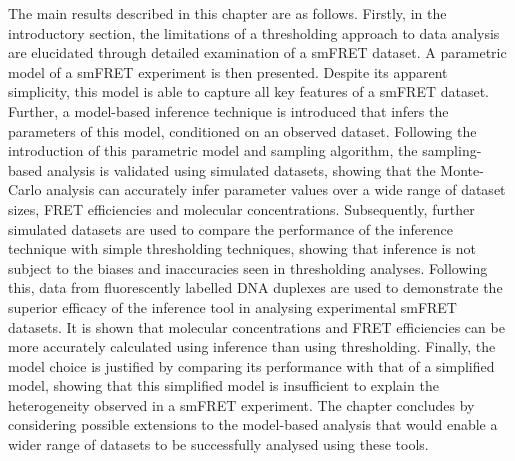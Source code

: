 The main results described in this chapter are as follows. Firstly, in the introductory section, the limitations of a thresholding approach to data analysis are elucidated through detailed examination of a smFRET dataset. A parametric model of a smFRET experiment is then presented. Despite its apparent simplicity, this model is able to capture all key features of a smFRET dataset. Further, a model-based inference technique is introduced that infers the parameters of this model, conditioned on an observed dataset. Following the introduction of this parametric model and sampling algorithm, the sampling-based analysis is validated using simulated datasets, showing that the Monte-Carlo analysis can accurately infer parameter values over a wide range of dataset sizes, FRET efficiencies and molecular concentrations. Subsequently, further simulated datasets are used to compare the performance of the inference technique with simple thresholding techniques, showing that inference is not subject to the biases and inaccuracies seen in thresholding analyses. Following this, data from fluorescently labelled DNA duplexes are used to demonstrate the superior efficacy of the inference tool in analysing experimental smFRET datasets. It is shown that molecular concentrations and FRET efficiencies can be more accurately calculated using inference than using thresholding. Finally, the model choice is justified by comparing its performance with that of a simplified model, showing that this simplified model is insufficient to explain the heterogeneity observed in a smFRET experiment. The chapter concludes by considering possible extensions to the model-based analysis that would enable a wider range of datasets to be successfully analysed using these tools.        



